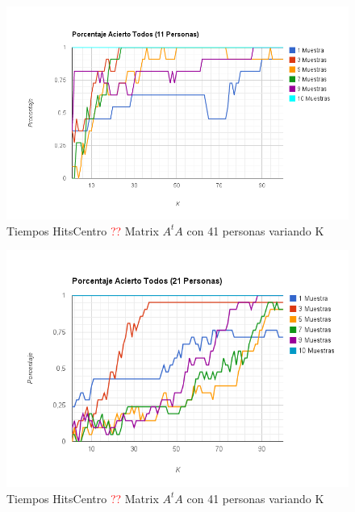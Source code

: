 \begin{figure}[H]
\includegraphics[width=1\textwidth]{img/imagef10.png}
     \caption{Tiempos HitsCentro \textcolor{red}{??} Matrix $A^tA$ con 41 personas variando K}
     \label{fig:figura1}
\end{figure}

\begin{figure}[H]
\includegraphics[width=1\textwidth]{img/imagef11.png}
     \caption{Tiempos HitsCentro \textcolor{red}{??} Matrix $A^tA$ con 41 personas variando K}
     \label{fig:figura1}
\end{figure}


